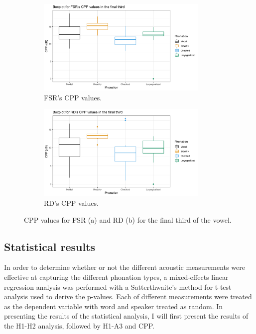 \documentclass[12pt, letterpaper]{article}
\begin{document}
\begin{figure}[!ht]
	\centering
	\begin{subfigure}{.5\textwidth}
		\centering
		\includegraphics[width=0.9\textwidth]{../mean_FSR_cpp_third.png}
		\caption{FSR's CPP values.}
		\label{fig:FSRcppthird} 
	\end{subfigure}%
	\begin{subfigure}{.5\textwidth}
		\centering
		\includegraphics[width=0.9\textwidth]{../mean_RD_cpp_third.png}
		\caption{RD's CPP values.}
		\label{fig:RDcppthird} 
	\end{subfigure}
	\caption{CPP values for FSR (a) and RD (b) for the final third of the vowel. }
	\label{fig:cppthird}
\end{figure}


\subsection{Statistical results} \label{sec:Stats}

In order to determine whether or not the different acoustic measurements were effective at capturing the different phonation types, a mixed-effects linear regression analysis was performed with a Satterthwaite's method for t-test analysis used to derive the p-values. Each of different measurements were treated as the dependent variable with word and speaker treated as random. In presenting the results of the statistical analysis, I will first present the results of the H1-H2 analysis, followed by H1-A3 and CPP. 
\end{document}
